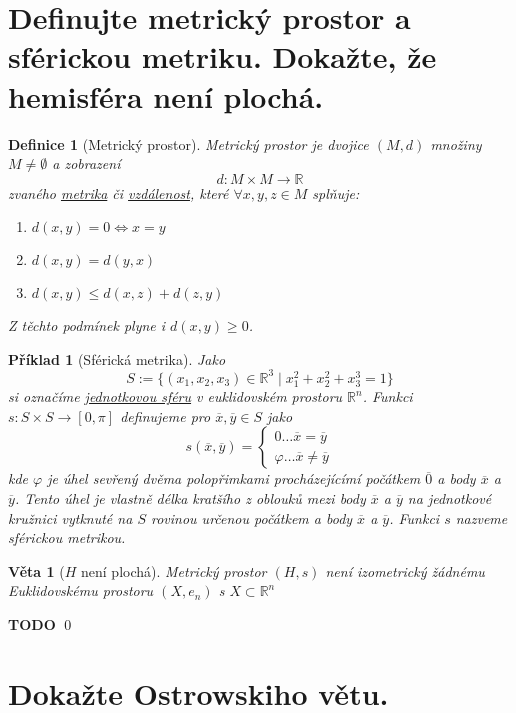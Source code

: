 \documentclass[11pt]{article}
\theoremstyle{nontheoremstyle}
\newtheorem*{definition}{Definice}
\newtheorem*{example}{Příklad}
\renewenvironment{proof}{{\noindent\bfseries Důkaz:}}{\qed}
\theoremstyle{nontheoremstylenodot}
\theoremstyle{theoremstyle}
\newtheorem*{theorem}{Věta}
\begin{document}
\section{Definujte metrický prostor a sférickou metriku. Dokažte, že hemisféra není plochá.}

\begin{definition}[Metrický prostor]
    Metrický prostor je dvojice $(M,d)$ množiny $M\neq \emptyset$ a zobrazení \[d: M \times M \to \mathbb{R}\]
    zvaného \underline{metrika} či \underline{vzdálenost}, které $\forall x,y,z \in M$ splňuje:
    \begin{enumerate}
        \item $d(x,y) = 0 \iff x=y$
        \item $d(x,y) = d(y,x)$
        \item $d(x,y) \leq d(x,z) + d(z,y)$
    \end{enumerate}
    Z těchto podmínek plyne i $d(x,y) \geq 0$.
\end{definition}

\begin{example}[Sférická metrika]
    Jako \[S := \{ (x_1,x_2,x_3) \in \mathbb{R}^3 \mid x_1^2 + x_2^2 + x_3^3 = 1 \}\] si označíme \underline{jednotkovou sféru} v
    euklidovském prostoru $\mathbb{R}^n$. Funkci $s: S\times S \to [0,\pi]$ definujeme pro $\overline{x}, \overline{y} \in S$
    jako \[ s(\overline{x}, \overline{y}) = \begin{cases}
        0 \dots \overline{x} = \overline{y}\\
        \varphi \dots \overline{x} \neq \overline{y}
    \end{cases} \]
    kde $\varphi$ je úhel sevřený dvěma polopřimkami procházejícímí počátkem $\overline{0}$ a body $\overline{x}$ a $\overline{y}$.
    Tento úhel je vlastně délka kratšího z oblouků mezi body $\overline{x}$ a $\overline{y}$ na jednotkové kružnici vytknuté na $S$ rovinou určenou
    počátkem a body $\overline{x}$ a $\overline{y}$. Funkci $s$ nazveme sférickou metrikou.
\end{example}

\begin{theorem}[$H$ není plochá]
    Metrický prostor $(H,s)$ není izometrický žádnému Euklidovskému prostoru $(X,e_n)$ s $X \subset \mathbb{R}^n$    
\end{theorem}
\begin{proof}
    \LARGE
    \textbf{TODO}
\end{proof}

\section{Dokažte Ostrowskiho větu.}
\end{document}
